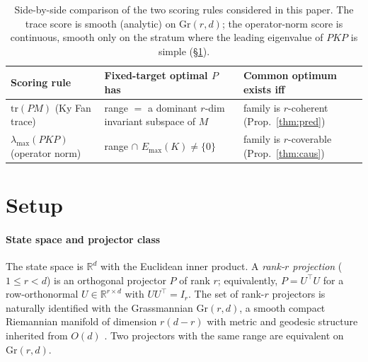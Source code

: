 \documentclass[final,3p,times]{elsarticle}
\newcommand{\Gr}{\mathrm{Gr}}
\newcommand{\tr}{\mathrm{tr}}
\newcommand{\R}{\mathbb{R}}
\newcommand{\Emax}{E_{\max}}
\begin{document}
\begin{table}[tbp]
\caption{Side-by-side comparison of the two scoring rules considered in
this paper. The trace score is smooth (analytic) on $\Gr(r,d)$; the
operator-norm score is continuous, smooth only on the stratum where the
leading eigenvalue of $PKP$ is simple (\S\ref{sec:setup}).}
\label{tab:compare}
\begin{center}
\begin{tabular}{lll}
\toprule
Scoring rule & Fixed-target optimal $P$ has & Common optimum exists iff \\
\midrule
$\tr(PM)$ (Ky Fan trace) &
range $=$ a dominant $r$-dim invariant subspace of $M$ &
family is $r$-coherent (Prop.~\ref{thm:pred}) \\
$\lambda_{\max}(PKP)$ (operator norm) &
range $\cap$ $\Emax(K)\ne\{0\}$ &
family is $r$-coverable (Prop.~\ref{thm:caus}) \\
\bottomrule
\end{tabular}
\end{center}
\end{table}

\section{Setup}
\label{sec:setup}

\paragraph{State space and projector class}
The state space is $\R^d$ with the Euclidean inner product.
A \emph{rank-$r$ projection} ($1 \le r < d$) is an orthogonal projector
$P$ of rank $r$; equivalently, $P = U^\top U$ for a row-orthonormal
$U \in \R^{r\times d}$ with $UU^\top = I_r$.
The set of rank-$r$ projectors is naturally identified with the
Grassmannian $\Gr(r,d)$, a smooth compact Riemannian manifold of
dimension $r(d-r)$ with metric and geodesic structure inherited from
$O(d)$ \cite{Edelman1998}.
Two projectors with the same range are equivalent on $\Gr(r,d)$.
\end{document}
